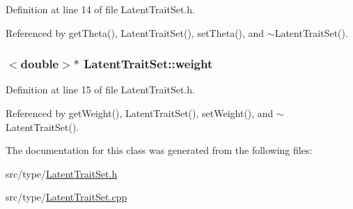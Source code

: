 Definition at line 14 of file Latent\+Trait\+Set.\+h.



Referenced by get\+Theta(), Latent\+Trait\+Set(), set\+Theta(), and $\sim$\+Latent\+Trait\+Set().

\hypertarget{classLatentTraitSet_a8db0053af1838ab0a4e25d5c6abc4384}{}
\subsubsection[{weight}]{$<$double$>$$\ast$ Latent\+Trait\+Set\+::weight\hspace{0.3cm}{\ttfamily [private]}}\label{classLatentTraitSet_a8db0053af1838ab0a4e25d5c6abc4384}


Definition at line 15 of file Latent\+Trait\+Set.\+h.



Referenced by get\+Weight(), Latent\+Trait\+Set(), set\+Weight(), and $\sim$\+Latent\+Trait\+Set().



The documentation for this class was generated from the following files\+:\begin{DoxyCompactItemize}
\item 
src/type/\hyperlink{LatentTraitSet_8h}{Latent\+Trait\+Set.\+h}\item 
src/type/\hyperlink{LatentTraitSet_8cpp}{Latent\+Trait\+Set.\+cpp}\end{DoxyCompactItemize}
